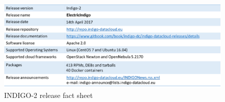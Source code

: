 \documentclass{article}
\begin{document}


\begin{figure}
  \centering
  \includegraphics[width=\textwidth]{./figs/TableII.pdf}
  \caption{INDIGO-2 release fact sheet}
  \label{tab:2}
\end{figure}




\end{document}

